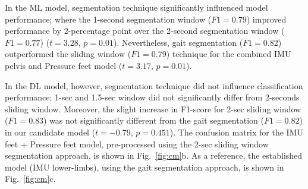 \documentclass[sensors,article,submit,pdftex,moreauthors]{Definitions/mdpi}
\begin{document}

\textcolor{revision2}{In the ML model}, segmentation technique significantly influenced model performance; \textcolor{revision2}{where the 1-second segmentation window ($F1=0.79$) improved performance by 2-percentage point over the 2-second segmentation window ($F1=0.77$) ($t=3.28$, $p=0.01$)}. Nevertheless, gait segmentation ($F1=0.82$) outperformed the sliding window  ($F1=0.79$) technique for the combined \textcolor{revision2}{IMU pelvis and Pressure feet} model ($t=3.17$, $p=0.01$). 

In the DL model, however, segmentation technique did not influence classification performance; \textcolor{revision2}{1-sec and 1.5-sec window did not significantly differ from 2-seconds sliding window. Moreover, t}he slight increase in F1-score for 2-sec sliding window ($F1=0.83$) was not significantly different from the gait segmentation ($F1=0.82$) in our \textcolor{revision2}{candidate} model ($t=-0.79$, $p=0.451$). The confusion matrix for the IMU feet + Pressure feet model, pre-processed using the 2-sec sliding window segmentation approach, is shown in Fig.~\ref{fig:cm}b. As a reference, the established model (IMU lower-limbs), using the gait segmentation approach, is shown in Fig.~\ref{fig:cm}c.
\end{document}
